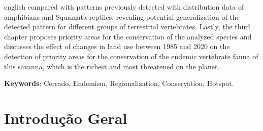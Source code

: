 \documentclass[12pt,openright,oneside,a4paper,english]{abntex2}
\begin{document}
\begin{resumo}[Abstract]
\begin{otherlanguage*}{english}
compared with patterns previously detected with distribution data of amphibians and Squamata reptiles, revealing potential generalization of the detected pattern for different groups of terrestrial vertebrates. Lastly, the third chapter proposes priority areas for the conservation of the analyzed species and discusses the effect of changes in land use between 1985 and 2020 on the detection of priority areas for the conservation of the endemic vertebrate fauna of this savanna, which is the richest and most threatened on the planet.
		\vspace{\onelineskip}
		\noindent
		
		\textbf{Keywords}: Cerrado, Endemism, Regionalization, Conservation, Hotspot.
	\end{otherlanguage*}
\end{resumo}

\tableofcontents
{}

\pagebreak


\textual
\setlength{\parindent}{1cm}
\newpage


\chapter*[Introdução Geral]{Introdução Geral}

\end{document}
